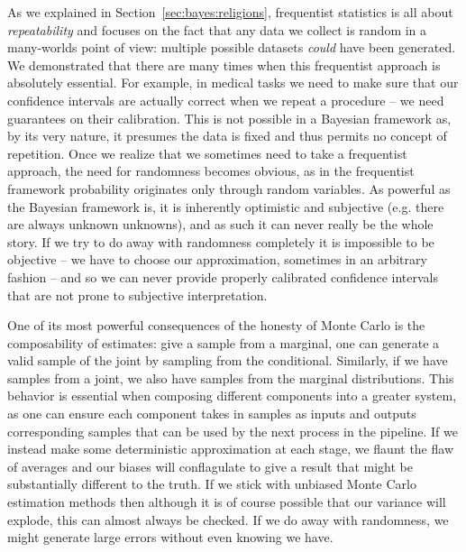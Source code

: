 As we explained in Section~\ref{sec:bayes:religions},
frequentist statistics is all about \emph{repeatability} and focuses on the fact that any data we collect is random
in a many-worlds point of view: multiple possible
datasets \emph{could} have been generated.  We demonstrated that there are many times when this frequentist
approach is absolutely essential.  For example, in medical tasks we need
to make sure that our confidence intervals are actually correct when we repeat a procedure -- we need guarantees on
their calibration.  This is not possible in a Bayesian framework as, by its very nature, it presumes the data
is fixed and thus permits no concept of repetition.  Once we realize that we sometimes need to take a frequentist
approach, the need for randomness becomes obvious, as in the frequentist framework probability originates only
through random variables.  As powerful as the Bayesian framework is, it is inherently optimistic and subjective
(e.g. there are always unknown unknowns), and as such it can never really be the whole story.  If we try to
do away with randomness completely it is impossible to be objective -- we have to choose our approximation, sometimes
in an arbitrary fashion -- and so we can never provide properly calibrated confidence 
intervals that are not prone to subjective interpretation.

One of its most powerful consequences of the honesty of Monte Carlo is the composability
of estimates: give a sample from a marginal, one can generate a valid sample of the joint by sampling from the
conditional.  Similarly, if we have samples from a joint, we also have samples from the marginal distributions.  This behavior
is essential when composing different components into a greater system, as one can ensure each component takes in
samples as inputs and outputs corresponding samples that can be used by the next process in the pipeline.
If we instead make some deterministic approximation at each stage, we flaunt the flaw of averages and our biases
will conflagulate to give a result that might be substantially different to the truth.  If we stick with unbiased Monte Carlo estimation
methods then although it is of course possible that our variance will explode, this can almost always be checked.
If we do away with randomness, we might generate large errors without even knowing we have.

